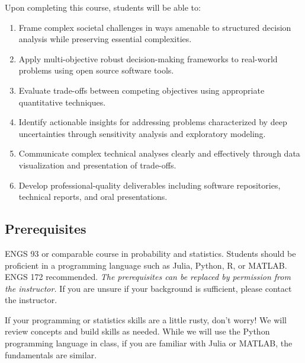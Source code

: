 \documentclass[
  11pt,
]{article}
\providecommand{\tightlist}{%
  \setlength{\itemsep}{0pt}\setlength{\parskip}{0pt}}\usepackage{longtable,booktabs,array}
\begin{document}
Upon completing this course, students will be able to:

\begin{enumerate}
\def\labelenumi{\arabic{enumi}.}
\tightlist
\item
  Frame complex societal challenges in ways amenable to structured
  decision analysis while preserving essential complexities.
\item
  Apply multi-objective robust decision-making frameworks to real-world
  problems using open source software tools.
\item
  Evaluate trade-offs between competing objectives using appropriate
  quantitative techniques.
\item
  Identify actionable insights for addressing problems characterized by
  deep uncertainties through sensitivity analysis and exploratory
  modeling.
\item
  Communicate complex technical analyses clearly and effectively through
  data visualization and presentation of trade-offs.
\item
  Develop professional-quality deliverables including software
  repositories, technical reports, and oral presentations.
\end{enumerate}

\subsection{Prerequisites}\label{prerequisites}

ENGS 93 or comparable course in probability and statistics. Students
should be proficient in a programming language such as Julia, Python, R,
or MATLAB. ENGS 172 recommended. \emph{The prerequisites can be replaced
by permission from the instructor.} If you are unsure if your background
is sufficient, please contact the instructor.

\begin{tcolorbox}[enhanced jigsaw, opacitybacktitle=0.6, colbacktitle=quarto-callout-tip-color!10!white, title=\textcolor{quarto-callout-tip-color}{\faLightbulb}\hspace{0.5em}{What If My Skills Are Rusty?}, coltitle=black, opacityback=0, rightrule=.15mm, titlerule=0mm, colback=white, colframe=quarto-callout-tip-color-frame, toprule=.15mm, breakable, arc=.35mm, bottomtitle=1mm, leftrule=.75mm, left=2mm, bottomrule=.15mm, toptitle=1mm]

If your programming or statistics skills are a little rusty, don't
worry! We will review concepts and build skills as needed. While we will
use the Python programming language in class, if you are familiar with
Julia or MATLAB, the fundamentals are similar.

\end{tcolorbox}
\end{document}
